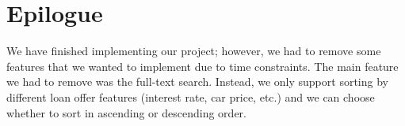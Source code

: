 \documentclass[fontsize=14pt]{article}
\begin{document}
\section*{Epilogue}
We have finished implementing our project; however, we had to remove some features that we wanted to implement due to time constraints. The main feature we had to remove was the full-text search. Instead, we only support sorting by different loan offer features (interest rate, car price, etc.) and we can choose whether to sort in ascending or descending order.
\end{document}
